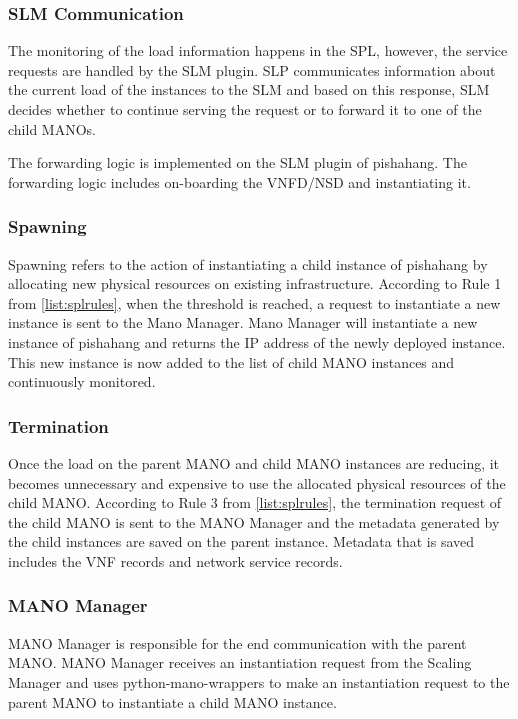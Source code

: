 \subsubsection*{SLM Communication}

The monitoring of the load information happens in the SPL, however, the service requests are handled by the SLM plugin. SLP communicates information about the current load of the instances to the SLM and based on this response, SLM decides whether to continue serving the request or to forward it to one of the child MANOs.

The forwarding logic is implemented on the SLM plugin of pishahang. The forwarding logic includes on-boarding the VNFD/NSD and instantiating it.

\subsubsection*{Spawning}

Spawning refers to the action of instantiating a child instance of pishahang by allocating new physical resources on existing infrastructure. According to Rule 1 from \ref{list:splrules}, when the threshold is reached, a request to instantiate a new instance is sent to the Mano Manager. Mano Manager will instantiate a new instance of pishahang and returns the IP address of the newly deployed instance. This new instance is now added to the list of child MANO instances and continuously monitored.
 

\subsubsection*{Termination}

Once the load on the parent MANO and child MANO instances are reducing, it becomes unnecessary and expensive to use the allocated physical resources of the child MANO. According to Rule 3 from \ref{list:splrules}, the termination request of the child MANO is sent to the MANO Manager and the metadata generated by the child instances are saved on the parent instance. Metadata that is saved includes the VNF records and network service records.


\subsubsection{MANO Manager}
MANO Manager is responsible for the end communication with the parent MANO. MANO Manager receives an instantiation request from the Scaling Manager and uses python-mano-wrappers to make an instantiation request to the parent MANO to instantiate a child MANO instance. 

